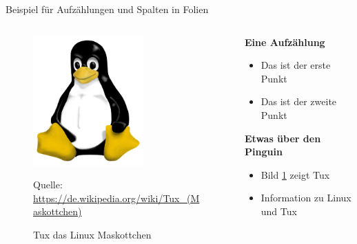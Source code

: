 \documentclass[mathserif,serif,german]{beamer}
\newcommand{\quelle}[1]{\caption*{\tiny Quelle: {#1}} } %
\begin{document}
\begin{frame}{Beispiel für Aufzählungen und Spalten in Folien}
	
	\begin{columns}
		
		\begin{column}{6cm}
			\flushleft
			\begin{figure}
				\centering
				\includegraphics[width=\columnwidth,height=5cm]{Figures/Pinguin}
				\caption[Pinguin]{Tux das Linux Maskottchen}
				\label{fig:Tux}
				\quelle{\url{https://de.wikipedia.org/wiki/Tux_(Maskottchen)}}
			\end{figure}
		
		\end{column}
	
		\begin{column}{6cm}
		
			\textbf{Eine Aufzählung}
			\begin{itemize}
				\item Das ist der erste Punkt
				\item Das ist der zweite Punkt
			\end{itemize}
		
			\textbf{Etwas über den Pinguin}
			\begin{itemize}
				\item Bild \ref{fig:Tux} zeigt Tux
				\item Information zu Linux und Tux \cite{Linux_Wiki,Tux_Maskottchen}
			\end{itemize}
			
		\end{column}
	
	\end{columns}	

\end{frame}
\end{document}
